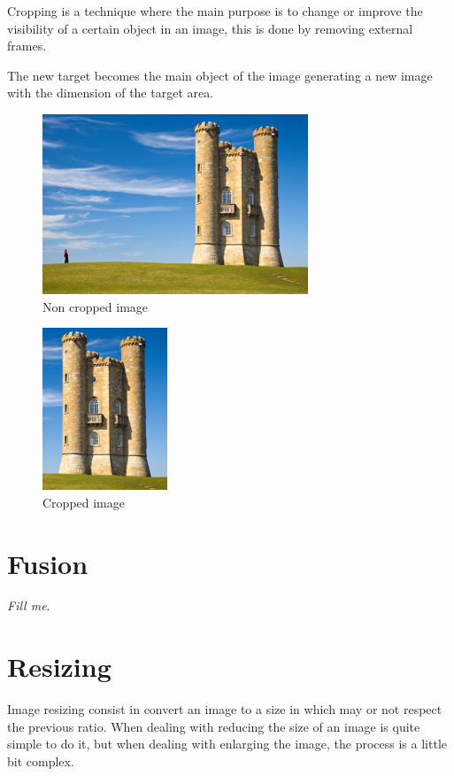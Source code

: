 \documentclass{article}
\begin{document}
	Cropping is a technique where the main purpose is to change or improve the visibility of a certain object in an image, 
	this is done by removing external frames. 

	The new target becomes the main object of the image generating a new image with the dimension of the target area.  

	\begin{figure} [H]
		\centering
		\includegraphics[scale=1]{images/crop_1}
		\caption{Non cropped image \label{crop_1}}
	\end{figure}

	\begin{figure} [H]
		\centering
		\includegraphics[scale=1]{images/crop_2}
		\caption{Cropped image \label{crop_2}}
	\end{figure}

\section{Fusion}

	\textit{Fill me}.

\section{Resizing}

	Image resizing consist in convert an image to a size in which may or not respect the previous ratio.
	When dealing with reducing the size of an image is quite simple to do it, but when dealing with enlarging 
	the image, the process is a little bit complex.
\end{document}
